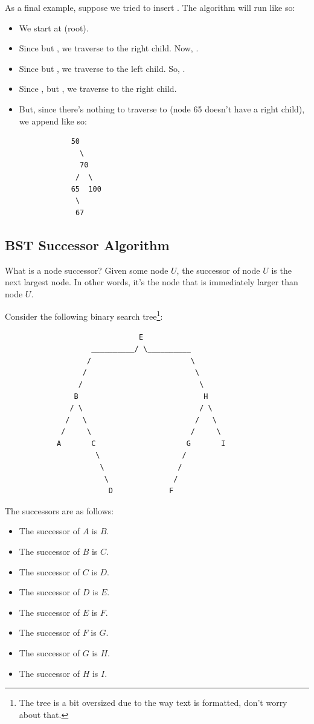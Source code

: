 \documentclass[letterpaper]{article}
\begin{document}
As a final example, suppose we tried to insert . The algorithm will run like so: 
\begin{itemize}
    \item We start at  (root). 
    \item Since  but , we traverse to the right child. Now, . 
    \item Since  but , we traverse to the left child. So, .
    \item Since , but , we traverse to the right child. 
    \item But, since there's nothing to traverse to (node 65 doesn't have a right child), we append  like so: 
        \begin{verbatim}
            50 
              \ 
              70 
             /  \ 
            65  100
             \
             67 
    \end{verbatim}
\end{itemize}

\subsection{BST Successor Algorithm}
What is a node successor? Given some node $U$, the successor of node $U$ is the next largest node. In other words, it's the node that is immediately larger than node $U$. 

\bigskip 

Consider the following binary search tree\footnote{The tree is a bit oversized due to the way text is formatted, don't worry about that.}: 
\begin{verbatim}
                               E
                    __________/ \__________
                   /                       \ 
                  /                         \
                 /                           \ 
                B                             H
               / \                           / \
              /   \                         /   \ 
             /     \                       /     \
            A       C                     G       I
                     \                   / 
                      \                 /
                       \               /
                        D             F
\end{verbatim}
The successors are as follows: 
\begin{itemize}
    \item The successor of $A$ is $B$. 
    \item The successor of $B$ is $C$. 
    \item The successor of $C$ is $D$. 
    \item The successor of $D$ is $E$. 
    \item The successor of $E$ is $F$.
    \item The successor of $F$ is $G$. 
    \item The successor of $G$ is $H$. 
    \item The successor of $H$ is $I$.  
\end{itemize}
\end{document}
